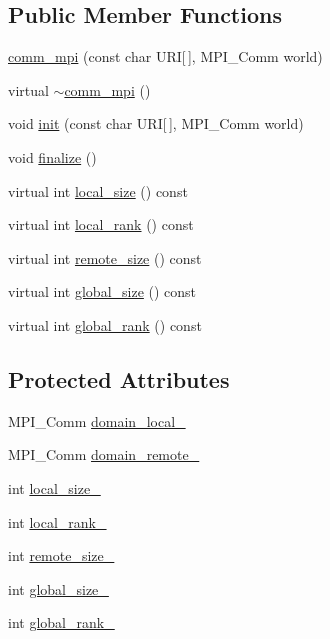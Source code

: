 \subsection*{Public Member Functions}
\begin{DoxyCompactItemize}
\item 
\hyperlink{classmui_1_1comm__mpi_a6116417b53d8634c453f3fa2e767c40d}{comm\+\_\+mpi} (const char U\+RI\mbox{[}$\,$\mbox{]}, M\+P\+I\+\_\+\+Comm world)
\item 
virtual \hyperlink{classmui_1_1comm__mpi_a3e55a5ec5ae58ca0f59c7e82afbd391d}{$\sim$comm\+\_\+mpi} ()
\item 
void \hyperlink{classmui_1_1comm__mpi_a4cb3bd6ed04dfea6bcf8ab8136beafaf}{init} (const char U\+RI\mbox{[}$\,$\mbox{]}, M\+P\+I\+\_\+\+Comm world)
\item 
void \hyperlink{classmui_1_1comm__mpi_a7f6419844f743488c069c600ad57d47f}{finalize} ()
\item 
virtual int \hyperlink{classmui_1_1comm__mpi_a580ce0c15f414fe6d80efa74cefa2338}{local\+\_\+size} () const
\item 
virtual int \hyperlink{classmui_1_1comm__mpi_ab0cf03ad7dbe099e0859a920f2711709}{local\+\_\+rank} () const
\item 
virtual int \hyperlink{classmui_1_1comm__mpi_abbf8ab973f51af297cc7ecf145f6cd84}{remote\+\_\+size} () const
\item 
virtual int \hyperlink{classmui_1_1comm__mpi_ad96c274b259a5aa4a4c18882dace97a7}{global\+\_\+size} () const
\item 
virtual int \hyperlink{classmui_1_1comm__mpi_ad2413502326fd78d453978abf96ad9de}{global\+\_\+rank} () const
\end{DoxyCompactItemize}
\subsection*{Protected Attributes}
\begin{DoxyCompactItemize}
\item 
M\+P\+I\+\_\+\+Comm \hyperlink{classmui_1_1comm__mpi_a54674e884ecca1e64d8ccdc6798c589e}{domain\+\_\+local\+\_\+}
\item 
M\+P\+I\+\_\+\+Comm \hyperlink{classmui_1_1comm__mpi_a414000a7c43087ca378d85c45dbaebc9}{domain\+\_\+remote\+\_\+}
\item 
int \hyperlink{classmui_1_1comm__mpi_ae9f2f6f5e3ea067feb9534dd2b5f0b40}{local\+\_\+size\+\_\+}
\item 
int \hyperlink{classmui_1_1comm__mpi_a143de5dac5348ae4e3929ed3a3d8459d}{local\+\_\+rank\+\_\+}
\item 
int \hyperlink{classmui_1_1comm__mpi_a7d9f55e3220ea9b5975cccc06645abf7}{remote\+\_\+size\+\_\+}
\item 
int \hyperlink{classmui_1_1comm__mpi_a69f9224cba14db3d63ef24a0e9cd1693}{global\+\_\+size\+\_\+}
\item 
int \hyperlink{classmui_1_1comm__mpi_a43678dec5d23ec36d1833e5c9c1b1f94}{global\+\_\+rank\+\_\+}
\end{DoxyCompactItemize}
